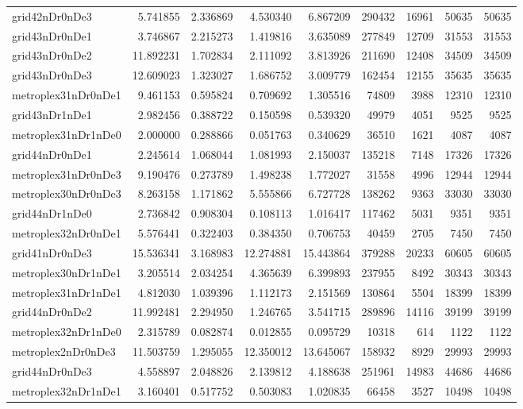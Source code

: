 \begin{longtable}{|l|r|r|r|r|r|r|r|r|}
grid42nDr0nDe3 & 5.741855 & 2.336869 & 4.530340 & 6.867209 & 290432 & 16961 & 50635 & 50635 \\
grid43nDr0nDe1 & 3.746867 & 2.215273 & 1.419816 & 3.635089 & 277849 & 12709 & 31553 & 31553 \\
grid43nDr0nDe2 & 11.892231 & 1.702834 & 2.111092 & 3.813926 & 211690 & 12408 & 34509 & 34509 \\
grid43nDr0nDe3 & 12.609023 & 1.323027 & 1.686752 & 3.009779 & 162454 & 12155 & 35635 & 35635 \\
metroplex31nDr0nDe1 & 9.461153 & 0.595824 & 0.709692 & 1.305516 & 74809 & 3988 & 12310 & 12310 \\
grid43nDr1nDe1 & 2.982456 & 0.388722 & 0.150598 & 0.539320 & 49979 & 4051 & 9525 & 9525 \\
metroplex31nDr1nDe0 & 2.000000 & 0.288866 & 0.051763 & 0.340629 & 36510 & 1621 & 4087 & 4087 \\
grid44nDr0nDe1 & 2.245614 & 1.068044 & 1.081993 & 2.150037 & 135218 & 7148 & 17326 & 17326 \\
metroplex31nDr0nDe3 & 9.190476 & 0.273789 & 1.498238 & 1.772027 & 31558 & 4996 & 12944 & 12944 \\
metroplex30nDr0nDe3 & 8.263158 & 1.171862 & 5.555866 & 6.727728 & 138262 & 9363 & 33030 & 33030 \\
grid44nDr1nDe0 & 2.736842 & 0.908304 & 0.108113 & 1.016417 & 117462 & 5031 & 9351 & 9351 \\
metroplex32nDr0nDe1 & 5.576441 & 0.322403 & 0.384350 & 0.706753 & 40459 & 2705 & 7450 & 7450 \\
grid41nDr0nDe3 & 15.536341 & 3.168983 & 12.274881 & 15.443864 & 379288 & 20233 & 60605 & 60605 \\
metroplex30nDr1nDe1 & 3.205514 & 2.034254 & 4.365639 & 6.399893 & 237955 & 8492 & 30343 & 30343 \\
metroplex31nDr1nDe1 & 4.812030 & 1.039396 & 1.112173 & 2.151569 & 130864 & 5504 & 18399 & 18399 \\
grid44nDr0nDe2 & 11.992481 & 2.294950 & 1.246765 & 3.541715 & 289896 & 14116 & 39199 & 39199 \\
metroplex32nDr1nDe0 & 2.315789 & 0.082874 & 0.012855 & 0.095729 & 10318 & 614 & 1122 & 1122 \\
metroplex2nDr0nDe3 & 11.503759 & 1.295055 & 12.350012 & 13.645067 & 158932 & 8929 & 29993 & 29993 \\
grid44nDr0nDe3 & 4.558897 & 2.048826 & 2.139812 & 4.188638 & 251961 & 14983 & 44686 & 44686 \\
metroplex32nDr1nDe1 & 3.160401 & 0.517752 & 0.503083 & 1.020835 & 66458 & 3527 & 10498 & 10498 \\

\end{longtable}
